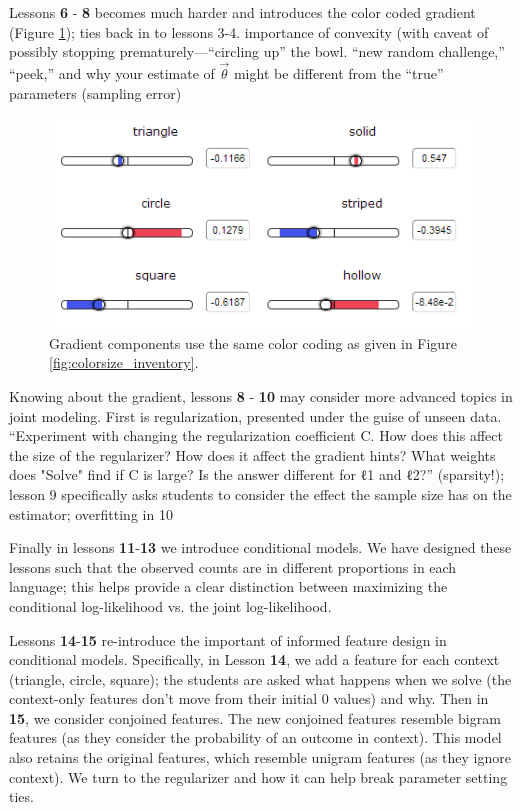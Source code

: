 \documentclass[11pt,letterpaper]{article}
\begin{document}
Lessons \textbf{6} - \textbf{8} becomes much harder and introduces the color coded gradient (Figure \ref{fig:gradients}); ties back in to lessons 3-4. importance of convexity (with caveat of possibly stopping prematurely---``circling up'' the bowl. ``new random challenge,'' ``peek,'' and why your estimate of $\vec{\theta}$ might be different from the ``true'' parameters (sampling error)

\begin{figure}[t]
\centering
\small
\includegraphics[scale=.65]{images/gradient-lesson7.PNG}
\caption{Gradient components use the same color coding as given in Figure \ref{fig:colorsize_inventory}.}
\label{fig:gradients}
\end{figure}


Knowing about the gradient, lessons \textbf{8} - \textbf{10} may consider more advanced topics in joint modeling. First is regularization, presented under the guise of unseen data. ``Experiment with changing the regularization coefficient C. How does this affect the size of the regularizer? How does it affect the gradient hints? What weights does "Solve" find if C is large? Is the answer different for ℓ1 and ℓ2?''  (sparsity!); lesson 9 specifically asks students to consider the effect the sample size has on the estimator; overfitting in 10

Finally in lessons \textbf{11}-\textbf{13} we introduce conditional models. We have designed these lessons such that the observed counts are in different proportions in each language; this helps provide a clear distinction between maximizing the conditional log-likelihood vs. the joint log-likelihood.

Lessons \textbf{14}-\textbf{15} re-introduce the important of informed feature design in conditional models. Specifically, in Lesson \textbf{14}, we add a feature for each context (triangle, circle, square); the students are asked what happens when we solve (the context-only features don't move from their initial 0 values) and why. Then in \textbf{15}, we consider conjoined features. The new conjoined features resemble bigram features (as they consider the probability of an outcome in context). This model also retains the original features, which resemble unigram features (as they ignore context). We turn to the regularizer and how it can help break parameter setting ties.
\end{document}
